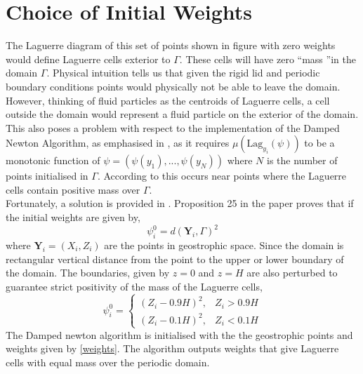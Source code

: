 \section{Choice of Initial Weights \label{Initweights}}
The Laguerre diagram of this set of points shown in figure  with zero weights would define Laguerre cells exterior to $\Gamma$. These cells will have zero \textquotedblleft mass \textquotedblright in the domain $\Gamma$. Physical intuition tells us that given the rigid lid and periodic boundary conditions points would physically not be able to leave the domain. However, thinking of fluid particles as the centroids of Laguerre cells, a cell outside the domain would represent a fluid particle on the exterior of the domain. This also poses a problem with respect to the implementation of the Damped Newton Algorithm, as emphasised in \cite{Merigot2017}, as it requires $\mu\left(\text{Lag}_{y_i}(\psi)\right)$ to be a monotonic function of $\psi = (\psi(y_1),...,\psi(y_N))$ where $N$ is the number of points initialised in $\Gamma$. According to \cite{Merigot2017} this occurs near points where the Laguerre cells contain positive mass over $\Gamma$.\\
\linebreak
Fortunately, a solution is provided in \cite{Merigot2017}. Proposition 25 in the paper proves that if the initial weights are given by,
\begin{equation*}
	\psi_i^0 = d\left(\bm{Y}_i,\Gamma\right)^2
\end{equation*}
where $\bm{Y}_i = \left(X_i,Z_i\right)$ are the points in geostrophic space. Since the domain is rectangular vertical distance from the point to the upper or lower boundary of the domain. The boundaries, given by $z=0$ and $z = H$ are also perturbed to guarantee strict positivity of the mass of the Laguerre cells, 
\begin{equation*}
\psi_i^0 = \begin{cases}
\left(Z_i - 0.9H\right)^2, & Z_i > 0.9H \\
\left(Z_i - 0.1H\right)^2, & Z_i < 0.1H
\end{cases}
\label{weights}
\end{equation*}
The Damped newton algorithm is initialised with the the geostrophic points and weights given by \ref{weights}. The algorithm outputs weights that give Laguerre cells with equal mass over the periodic domain.
